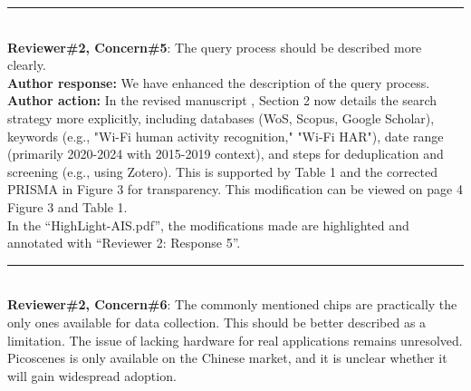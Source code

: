 \documentclass[Afour,sageh,times]{sagej}
\begin{document}
\color{gray}\rule{\linewidth}{1pt}\normalcolor\\

\textcolor{myGreen}{ \textbf{Reviewer\#2, Concern\#5}: The query process should be described more clearly.}  \\

\textbf{Author response:} We have enhanced the description of the query process.\\
\textbf{Author action:} In the revised manuscript , Section 2 now details the search strategy more explicitly, including databases (WoS, Scopus, Google Scholar), keywords (e.g., "Wi-Fi human activity recognition," "Wi-Fi HAR"), date range (primarily 2020-2024 with 2015-2019 context), and steps for deduplication and screening (e.g., using Zotero). This is supported by Table 1 and the corrected PRISMA in Figure 3 for transparency.  This modification can be viewed on page 4 Figure 3 and Table 1. \\

\textcolor{myOrange}{
In the “HighLight-AIS.pdf”, the modifications made are highlighted and annotated with “Reviewer 2: Response 5”.  }\\

\color{gray}\rule{\linewidth}{1pt}\normalcolor\\

\textcolor{myGreen}{ \textbf{Reviewer\#2, Concern\#6}: The commonly mentioned chips are practically the only ones available for data collection. This should be better described as a limitation. The issue of lacking hardware for real applications remains unresolved. Picoscenes is only available on the Chinese market, and it is unclear whether it will gain widespread adoption.}  \\

\end{document}
